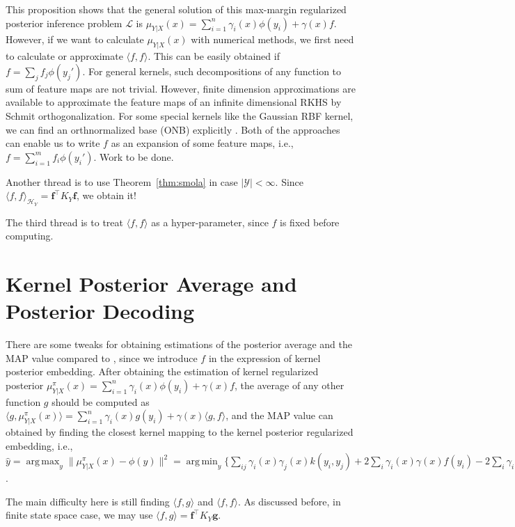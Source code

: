 \documentclass[a4paper]{article}
\renewcommand{\bf}{\mathbf}
\renewcommand{\cal}{\mathcal}
\newcommand{\T}{\intercal}
\DeclareMathOperator*{\argmin}{arg\,min}
\DeclareMathOperator*{\argmax}{arg\,max}
\newcommand{\thmref}[1]{Theorem~\ref{#1}}
\begin{document}
This proposition shows that the general solution of this max-margin regularized posterior inference problem $\cal{L}$ is $\mu_{Y|X}(x) = \sum_{i=1}^n \gamma_i(x) \phi(y_i) + \gamma(x) f$. However, if we want to calculate $\mu_{Y|X}(x)$ with numerical methods, we first need to calculate or approximate $\langle f,f \rangle$. This can be easily obtained if $f = \sum_j f_j\phi(y_j')$. For general kernels, such decompositions of any function to sum of feature maps are not trivial. However, finite dimension approximations \cite{rahimi2007random}\cite{oliva2015bayesian} are available to approximate the feature maps of an infinite dimensional RKHS by Schmit orthogonalization. For some special kernels like the Gaussian RBF kernel, we can find an orthnormalized base (ONB) explicitly \cite{steinwart2006explicit}. Both of the approaches can enable us to write $f$ as an expansion of some feature maps, i.e., $f = \sum_{i=1}^{m} f_i\phi(y_i')$. {\color{red} Work to be done.} 

Another thread is to use \thmref{thm:smola} in case $|\cal{Y}| < \infty$. Since $\langle f, f\rangle_{\cal{H}_Y} = \bf{f}^\T K_Y \bf{f}$, we obtain it! 

The third thread is to treat $\langle f,f\rangle$ as a hyper-parameter, since $f$ is fixed before computing.

\section{Kernel Posterior Average and Posterior Decoding}
There are some tweaks for obtaining estimations of the posterior average and the MAP value compared to \cite{song2013kernel}, since we introduce $f$ in the expression of kernel posterior embedding. After obtaining the estimation of kernel regularized posterior $\mu_{Y|X}^\pi(x) = \sum_{i=1}^n \gamma_i(x) \phi(y_i) + \gamma(x) f$, the average of any other function $g$ should be computed as $\langle g, \mu_{Y|X}^\pi(x)\rangle = \sum_{i=1}^{n} \gamma_i(x)g(y_i) + \gamma(x) \langle g,f\rangle$, and the MAP value can obtained by finding the closest kernel mapping to the kernel posterior regularized embedding, i.e., $\hat{y} = \argmax_{y} \|\mu_{Y|X}^\pi(x) - \phi(y)\|^2 = \argmin_{y} \{\sum_{ij}\gamma_i(x)\gamma_j(x)k(y_i,y_j) + 2\sum_i \gamma_i(x)\gamma(x)f(y_i) %
- 2\sum_i\gamma_i(x)k(y_i,y) - 2\gamma(x)f(y) + k(y,y)\}$. 

The main difficulty here is still finding $\langle f,g\rangle$ and $\langle f,f\rangle$. As discussed before, in finite state space case, we may use $\langle f,g\rangle = \bf{f}^\T K_Y \bf{g}$.
\end{document}
